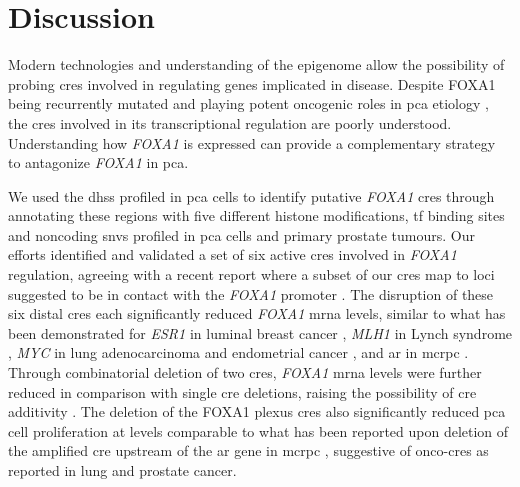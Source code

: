 \section{Discussion}

Modern technologies and understanding of the epigenome allow the possibility of probing \glspl{cre} involved in regulating genes implicated in disease.
Despite FOXA1 being recurrently mutated \cite{abeshouseMolecularTaxonomyPrimary2015,fraserGenomicHallmarksLocalized2017,barbieriExomeSequencingIdentifies2012,grassoMutationalLandscapeLethal2012,robinsonIntegrativeClinicalGenomics2015} and playing potent oncogenic roles in \gls{pca} etiology \cite{paroliaDistinctStructuralClasses2019,adamsFOXA1MutationsAlter2019,gaoForkheadDomainMutations2019}, the \glspl{cre} involved in its transcriptional regulation are poorly understood.
Understanding how \emph{FOXA1} is expressed can provide a complementary strategy to antagonize \emph{FOXA1} in \gls{pca}.

We used the \glspl{dhs} profiled in \gls{pca} cells to identify putative \emph{FOXA1} \glspl{cre} through annotating these regions with five different histone modifications, \gls{tf} binding sites and noncoding \glspl{snv} profiled in \gls{pca} cells and primary prostate tumours.
Our efforts identified and validated a set of six active \glspl{cre} involved in \emph{FOXA1} regulation, agreeing with a recent report where a subset of our \glspl{cre} map to loci suggested to be in contact with the \emph{FOXA1} promoter \cite{rhieHighresolution3DEpigenomic2019}.
The disruption of these six distal \glspl{cre} each significantly reduced \emph{FOXA1} \gls{mrna} levels, similar to what has been demonstrated for \emph{ESR1} in luminal breast cancer \cite{baileyNoncodingSomaticInherited2016}, \emph{MLH1} in Lynch syndrome \cite{liuDisruption35Kb2018}, \emph{MYC} in lung adenocarcinoma and endometrial cancer \cite{zhangIdentificationFocallyAmplified2016}, and \gls{ar} in \gls{mcrpc} \cite{takedaSomaticallyAcquiredEnhancer2018,viswanathanStructuralAlterationsDriving2018}.
Through combinatorial deletion of two \glspl{cre}, \emph{FOXA1} \gls{mrna} levels were further reduced in comparison with single \gls{cre} deletions, raising the possibility of \gls{cre} additivity \cite{osterwalderEnhancerRedundancyProvides2018}.
The deletion of the FOXA1 plexus \glspl{cre} also significantly reduced \gls{pca} cell proliferation at levels comparable to what has been reported upon deletion of the amplified \gls{cre} upstream of the \gls{ar} gene in \gls{mcrpc} \cite{takedaSomaticallyAcquiredEnhancer2018}, suggestive of onco-\glspl{cre} as reported in lung \cite{zhangIdentificationFocallyAmplified2016} and prostate \cite{takedaSomaticallyAcquiredEnhancer2018} cancer.

